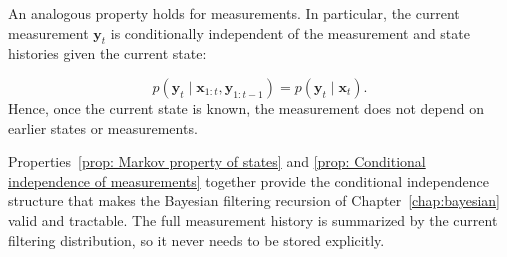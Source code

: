 \begin{property}
An analogous property holds for measurements. In particular, the current measurement $\mathbf{y}_t$ is conditionally independent of the measurement and state histories given the current state: 

\begin{equation}\label{prop: Conditional independence of measurements}
p(\mathbf{y}_t \mid \mathbf{x}_{1:t}, \mathbf{y}_{1:t-1}) = p(\mathbf{y}_t \mid \mathbf{x}_t).    
\end{equation}
Hence, once the current state is known, the measurement does not depend on earlier states or measurements.
\end{property}

Properties~\eqref{prop: Markov property of states} and \eqref{prop: Conditional independence of measurements} together provide the conditional independence structure that makes the Bayesian filtering recursion of Chapter~\ref{chap:bayesian} valid and tractable. The full measurement history is summarized by the current filtering distribution, so it never needs to be stored explicitly.


